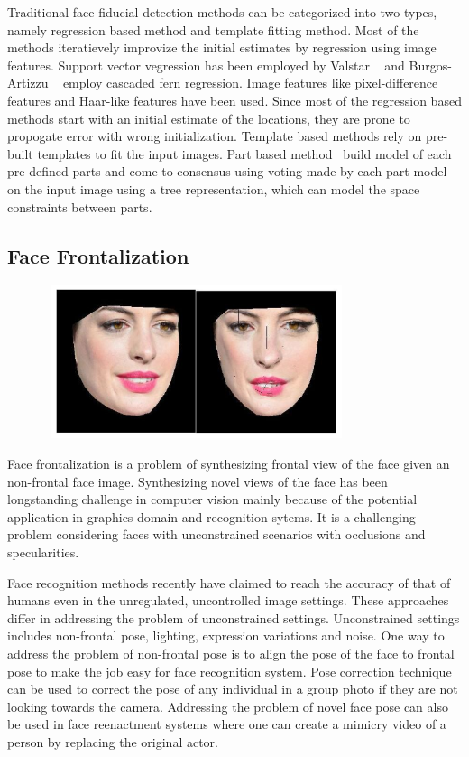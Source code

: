 Traditional face fiducial detection methods can be categorized into two types, namely regression
based method and template fitting method. Most of the methods iteratievely improvize the initial
 estimates by regression using image features. Support vector vegression has been employed by
Valstar \etal~\cite{FrancoisValstarMBP10} and Burgos-Artizzu \etal~\cite{artizzzuICCV13_COFW} employ cascaded fern regression. Image features 
like pixel-difference features and Haar-like features have been used. Since most of the regression
based methods start with an initial estimate of the locations, they are prone to propogate error with 
wrong initialization. Template based methods rely on pre-built templates to fit the input images.
Part based method~\cite{xhuCVPR12_wild} build model of each pre-defined parts and come to consensus using voting 
made by each part model on the input image using a tree representation, which can model the space constraints between parts.

\subsection{Face Frontalization}

\begin{figure}[!ht]
  \centering
  \includegraphics[width=9cm,height=4.5cm]{intro/figures/face_front.png}
  \caption{}
  \label{fig:intro_face_front}
\end{figure}

%

Face frontalization is a problem of synthesizing frontal view of the face given an non-frontal
face image. Synthesizing novel views of the face has been longstanding challenge in computer vision
mainly because of the potential application in graphics domain and recognition sytems. It is a challenging
problem considering faces with unconstrained scenarios with occlusions and specularities. 

Face recognition methods recently have claimed to reach the accuracy of that of humans even in
the unregulated, uncontrolled image settings. These approaches differ in addressing the problem 
of unconstrained settings. Unconstrained settings includes non-frontal pose, lighting, expression
variations and noise. One way to address the problem of non-frontal pose is to align the pose 
of the face to frontal pose to make the job easy for face recognition system. Pose correction 
technique can be used to correct the pose of any individual in a group photo if they are not looking
towards the camera. Addressing the problem of novel face pose can also be used in face 
reenactment systems where one can create a mimicry video of a person by replacing the original
actor.

